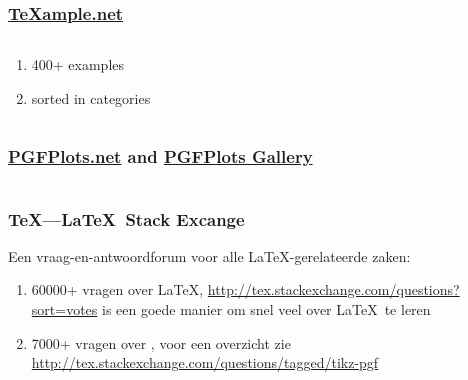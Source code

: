 \begin{frame}
  \frametitle{\url{TeXample.net}}

  \begin{columns}
    \begin{column}{.33\textwidth}
      \begin{enumerate}
        \item 400+ examples
        \item sorted in categories
      \end{enumerate}
    \end{column}

    \begin{column}{.66\textwidth}
      \begin{flushright}
      \end{flushright}
    \end{column}
  \end{columns}
\end{frame}

\begin{frame}
  \frametitle{\url{PGFPlots.net} and \href{https://pgfplots.sourceforge.net/gallery.html}{PGFPlots Gallery}}

  \begin{columns}
    \begin{column}{.45\textwidth}
      \begin{flushright}
      \end{flushright}
    \end{column}

    \begin{column}{.45\textwidth}
      \begin{flushright}
      \end{flushright}
    \end{column}
  \end{columns}
\end{frame}

\begin{frame}
  \frametitle{\TeX---\LaTeX\  Stack Excange}

  \small
  Een vraag-en-antwoordforum voor alle \LaTeX-gerelateerde zaken:
  \begin{enumerate}
    \item 60000+ vragen over \LaTeX, \url{http://tex.stackexchange.com/questions?sort=votes} is een goede manier om snel veel over \LaTeX\ te leren
    \item 7000+ vragen over \TikZ, voor een overzicht zie \url{http://tex.stackexchange.com/questions/tagged/tikz-pgf}
  \end{enumerate}
\end{frame}


